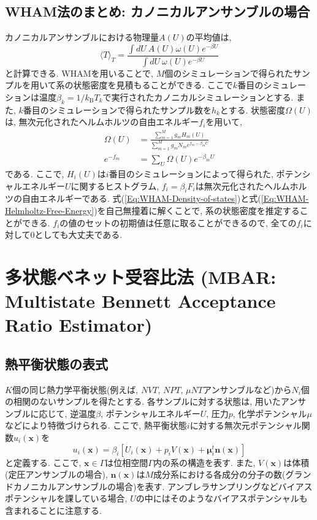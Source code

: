 \subsection{WHAM法のまとめ: カノニカルアンサンブルの場合}
カノニカルアンサンブルにおける物理量$A(U)$の平均値は, 
\begin{equation}
    \langle T \rangle_{T} =
    \frac{\int dU~A(U) \omega(U) e^{-\beta U}}{\int dU~\omega(U) e^{-\beta U}}
\end{equation}
と計算できる. 
WHAMを用いることで, $M$個のシミュレーションで得られたサンプルを用いて系の状態密度を見積もることができる. 
ここで$k$番目のシミュレーションは温度$\beta_{k} = 1 / k_{\mathrm{B}} T_{k}$で実行されたカノニカルシミュレーションとする. 
また, $k$番目のシミュレーションで得られたサンプル数を$h_{k}$とする. 
状態密度$\Omega(U)$は, 無次元化されたヘルムホルツの自由エネルギー$f_{i}$を用いて, 
\begin{align}
    \Omega(U) &=
    \frac{\sum_{m=1}^{M} g_{m} H_{m}(U)}{\sum_{m=1}^{M} g_{m} N_{m} e^{f_{m} - \beta_{m} U}}
    \label{Eq:WHAM-Density-of-states}
    \\
    e^{-f_{m}} &=
    \sum_{U} \Omega (U) e^{-\beta_{m}U}
    \label{Eq:WHAM-Helmholtz-Free-Energy}
\end{align}
である. ここで, $H_{i}(U)$は$i$番目のシミュレーションによって得られた, ポテンシャルエネルギー$U$に関するヒストグラム, $f_{i} = \beta_{i} F_{i}$は無次元化されたヘルムホルツの自由エネルギーである. 
式(\ref{Eq:WHAM-Density-of-states})と式(\ref{Eq:WHAM-Helmholtz-Free-Energy})を自己無撞着に解くことで, 系の状態密度を推定することができる. 
$f_{i}$の値のセットの初期値は任意に取ることができるので, 全ての$f_{i}$に対して0としても大丈夫である. 

\section{多状態ベネット受容比法 (MBAR: Multistate Bennett Acceptance Ratio Estimator)}
\subsection{熱平衡状態の表式}
$K$個の同じ熱力学平衡状態(例えば, $NVT$, $NPT$, $\mu NT$アンサンブルなど)から$N_{i}$個の相関のないサンプルを得たとする. 
各サンプルに対する状態は, 用いたアンサンブルに応じて, 逆温度$\beta$, ポテンシャルエネルギー$U$, 圧力$p$, 化学ポテンシャル$\mu$などにより特徴づけられる. 
ここで, 熱平衡状態$i$に対する無次元ポテンシャル関数$u_{i}(\bm{x})$を
\begin{equation}
    u_{i}(\bm{x}) =
    \beta_{i}
    \left[
        U_{i}(\bm{x}) + p_{i}V(\bm{x}) + \bm{\mu}_{i}^{t} \bm{n}(\bm{x})
    \right]
\end{equation}
と定義する. 
ここで, $\bm{x} \in \Gamma$は位相空間$\Gamma$内の系の構造を表す. 
また, $V(\bm{x})$は体積(定圧アンサンブルの場合), $\bm{n}(\bm{x})$は$M$成分系における各成分の分子の数(グランドカノニカルアンサンブルの場合)を表す. 
アンブレラサンプリングなどバイアスポテンシャルを課している場合, $U$の中にはそのようなバイアスポテンシャルも含まれることに注意する. 

